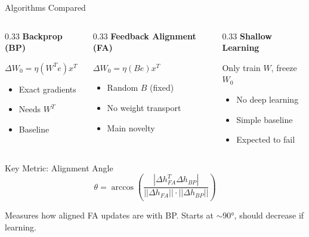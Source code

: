 \documentclass[aspectratio=169,10pt]{beamer}
\begin{document}
\begin{frame}{Algorithms Compared}
  \begin{columns}[T]
    \begin{column}{0.33\textwidth}
      \centering
      \textbf{Backprop (BP)}

      \vspace{0.3cm}
      $\Delta W_0 = \eta (W^T e) x^T$

      \vspace{0.3cm}
      \begin{itemize}
        \item Exact gradients
        \item Needs $W^T$
        \item Baseline
      \end{itemize}
    \end{column}

    \begin{column}{0.33\textwidth}
      \centering
      \textbf{Feedback Alignment (FA)}

      \vspace{0.3cm}
      $\Delta W_0 = \eta (B e) x^T$

      \vspace{0.3cm}
      \begin{itemize}
        \item Random $B$ (fixed)
        \item No weight transport
        \item \alert{Main novelty}
      \end{itemize}
    \end{column}

    \begin{column}{0.33\textwidth}
      \centering
      \textbf{Shallow Learning}

      \vspace{0.3cm}
      Only train $W$, freeze $W_0$

      \vspace{0.3cm}
      \begin{itemize}
        \item No deep learning
        \item Simple baseline
        \item Expected to fail
      \end{itemize}
    \end{column}
  \end{columns}

  \vspace{0.5cm}
  \begin{block}{Key Metric: Alignment Angle}
    \[
    \theta = \arccos\left(\frac{|\Delta h_{FA}^T \Delta h_{BP}|}{||\Delta h_{FA}|| \cdot ||\Delta h_{BP}||}\right)
    \]

    Measures how aligned FA updates are with BP. Starts at $\sim$90°, should decrease if learning.
  \end{block}
\end{frame}
\end{document}
